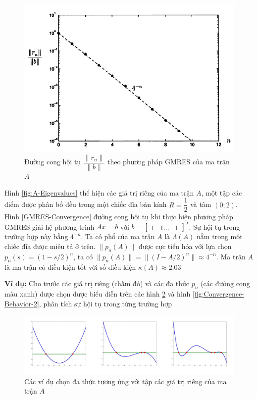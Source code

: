 \documentclass[14pt, a4paper]{article}
\numberwithin{equation}{section}
\numberwithin{algorithm}{section}
\numberwithin{figure}{section}
\numberwithin{dl}{section}
\numberwithin{md}{section}
\numberwithin{bd}{section}
\numberwithin{dn}{section}
\begin{document}
\begin{figure}[h!] \centering

    \includegraphics[scale=0.6]{GMRES-Convergence-Curve.jpg}
    \caption{Đường cong hội tụ $\dfrac{\lVert r_n \rVert}{\lVert b \rVert} $ theo phương pháp GMRES của ma trận $A$ \cite{trefethen1997numerical}}

    \label{fig:GMRES-Convergence-Curve}
\end{figure}

Hình \ref{fig:A-Eigenvalues} thể hiện các giá trị riêng của ma trận $A$, một tập các điểm được phân bố đều trong một chiếc đĩa bán kính $R=\dfrac{1}{2}$ và tâm $(0;2)$. Hình \ref{GMRES-Convergence} đường cong hội tụ khi thực hiện phương pháp GMRES giải hệ phương trình $Ax=b$ với $b=\begin{bmatrix} 1 & 1 \dots & 1 \end{bmatrix}^T$. Sự hội tụ trong trường hợp này bằng $4^{-n}$. Ta có phổ của ma trận $A$ là $\Lambda(A)$ nằm trong một chiếc đĩa được miêu tả ở trên. $\lVert p_n(A) \rVert $ được cực tiểu hóa với lựa chọn $p_n(s)=(1-s/2)^n$, ta có $\lVert p_n(A) \rVert = \lVert (I - A/2)^n \rVert \approx 4^{-n}$. Ma trận $A$ là ma trận có điều kiện tốt với số điều kiện $\kappa(A) \approx 2.03$

\textbf{Ví dụ:} Cho trước các giá trị riêng (chấm đỏ) và các đa thức $p_n$ (các đường cong màu xanh) được chọn được biểu diễn trên các hình \ref{fig:Convergence-Behavior-1} và hình \ref{fig:Convergence-Behavior-2}, phân tích sự hội tụ trong từng trường hợp

\begin{figure}[h!] \centering

    \includegraphics[scale=0.5]{Convergence-Behavior-1.jpg}
    \caption{Các ví dụ chọn đa thức tương ứng với tập các giá trị riêng của ma trận $A$}

    \label{fig:Convergence-Behavior-1}
\end{figure}
\end{document}
